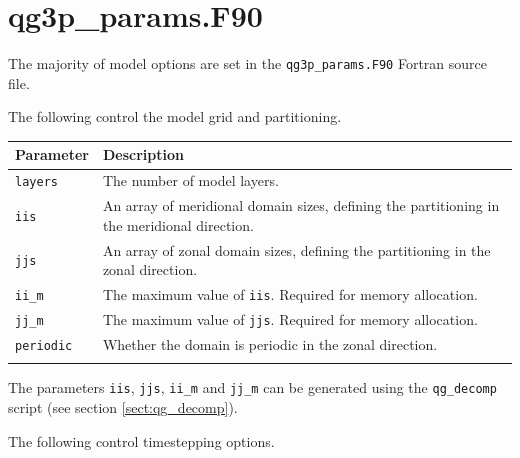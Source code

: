 \documentclass[a4paper]{book}
\begin{document}
\section{qg3p\_params.F90}\label{sect:qg3p_params}

The majority of model options are set in the \verb+qg3p_params.F90+ Fortran
source file.

The following control the model grid and partitioning.

\begin{longtable}{ | p{} | p{} | }
  \hline
  Parameter & Description \\
  \hline
  \endhead
  \verb+layers+   & The number of model layers. \\
  \verb+iis+      & An array of meridional domain sizes, defining the
                    partitioning in the meridional direction. \\
  \verb+jjs+      & An array of zonal domain sizes, defining the partitioning in
                    the zonal direction. \\
  \verb+ii_m+     & The maximum value of \verb+iis+. Required for memory
                    allocation. \\
  \verb+jj_m+     & The maximum value of \verb+jjs+. Required for memory
                    allocation. \\
  \verb+periodic+ & Whether the domain is periodic in the zonal direction. \\
  \hline
  \endfoot
\end{longtable}

The parameters \verb+iis+, \verb+jjs+, \verb+ii_m+ and \verb+jj_m+ can be
generated using the \verb+qg_decomp+ script (see section \ref{sect:qg_decomp}).

The following control timestepping options.
\end{document}
